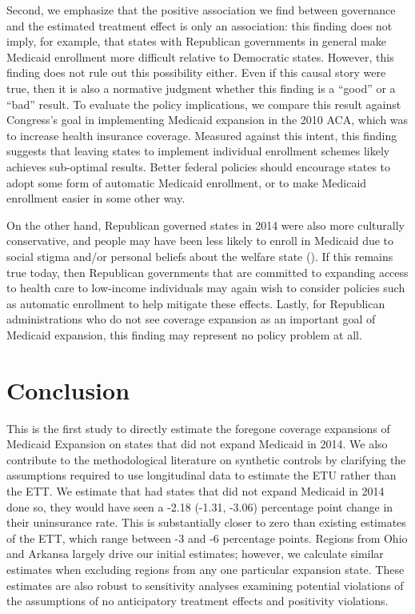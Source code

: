 \documentclass[12pt]{article}
\begin{document}
Second, we emphasize that the positive association we find between governance and the estimated treatment effect is only an association: this finding does not imply, for example, that states with Republican governments in general make Medicaid enrollment more difficult relative to Democratic states. However, this finding does not rule out this possibility either. Even if this causal story were true, then it is also a normative judgment whether this finding is a ``good'' or a ``bad'' result. To evaluate the policy implications, we compare this result against Congress's goal in implementing Medicaid expansion in the 2010 ACA, which was to increase health insurance coverage. Measured against this intent, this finding suggests that leaving states to implement individual enrollment schemes likely achieves sub-optimal results. Better federal policies should encourage states to adopt some form of automatic Medicaid enrollment, or to make Medicaid enrollment easier in some other way.

On the other hand, Republican governed states in 2014 were also more culturally conservative, and people may have been less likely to enroll in Medicaid due to social stigma and/or personal beliefs about the welfare state (\cite{sommers2012understanding}). If this remains true today, then Republican governments that are committed to expanding access to health care to low-income individuals may again wish to consider policies such as automatic enrollment to help mitigate these effects. Lastly, for Republican administrations who do not see coverage expansion as an important goal of Medicaid expansion, this finding may represent no policy problem at all.

\section{Conclusion}

This is the first study to directly estimate the foregone coverage expansions of Medicaid Expansion on states that did not expand Medicaid in 2014. We also contribute to the methodological literature on synthetic controls by clarifying the assumptions required to use longitudinal data to estimate the ETU rather than the ETT. We estimate that had states that did not expand Medicaid in 2014 done so, they would have seen a -2.18 (-1.31, -3.06) percentage point change in their uninsurance rate. This is substantially closer to zero than existing estimates of the ETT, which range between -3 and -6 percentage points. Regions from Ohio and Arkansa largely drive our initial estimates; however, we calculate similar estimates when excluding regions from any one particular expansion state. These estimates are also robust to sensitivity analyses examining potential violations of the assumptions of no anticipatory treatment effects and positivity violations. 
\end{document}
